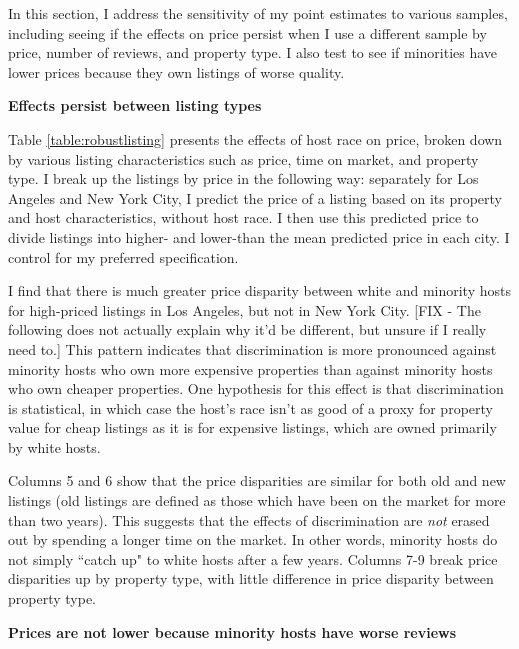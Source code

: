 
In this section, I address the sensitivity of my point estimates to various samples, including seeing if the effects on price persist when I use a different sample by price, number of reviews, and property type. I also test to see if minorities have lower prices because they own listings of worse quality. 

\textbf{Effects persist between listing types}



Table \ref{table:robustlisting} presents the effects of host race on price, broken down by various listing characteristics such as price, time on market, and property type. I break up the listings by price in the following way: separately for Los Angeles and New York City, I predict the price of a listing based on its property and host characteristics, without host race. I then use this predicted price to divide listings into higher- and lower-than the mean predicted price in each city. I control for my preferred specification.  

I find that there is much greater price disparity between white and minority hosts for high-priced listings in Los Angeles, but not in New York City. [FIX - The following does not actually explain why it'd be different, but unsure if I really need to.] This pattern indicates that discrimination is more pronounced against minority hosts who own more expensive properties than against minority hosts who own cheaper properties. One hypothesis for this effect is that discrimination is statistical, in which case the host's race isn't as good of a proxy for property value for cheap listings as it is for expensive listings, which are owned primarily by white hosts. 

Columns 5 and 6 show that the price disparities are similar for both old and new listings (old listings are defined as those which have been on the market for more than two years). This suggests that the effects of discrimination are \textit{not} erased out by spending a longer time on the market. In other words, minority hosts do not simply ``catch up" to white hosts after a few years. Columns 7-9 break price disparities up by property type, with little difference in price disparity between property type. 

\textbf{Prices are not lower because minority hosts have worse reviews} 

